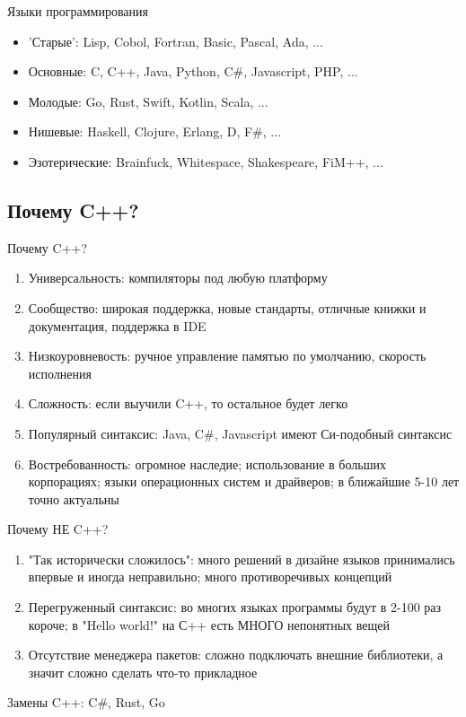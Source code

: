 \documentclass[10pt]{beamer}
\begin{document}
\begin{frame}{Языки программирования}
\begin{itemize}
    \item 'Старые': Lisp, Cobol, Fortran, Basic, Pascal, Ada, ...
    \item Основные: C, C++, Java, Python, C\#, Javascript, PHP, ...
    \item Молодые: Go, Rust, Swift, Kotlin, Scala, ...
    \item Нишевые: Haskell, Clojure, Erlang, D, F\#, ...
    \item Эзотерические: Brainfuck, Whitespace, Shakespeare, FiM++, ...
\end{itemize}
\end{frame}

\subsection{Почему C++?}
\begin{frame}{Почему C++?}
\begin{enumerate}
    \item Универсальность: компиляторы под любую платформу
    \item Сообщество: широкая поддержка, новые стандарты, отличные книжки и документация, поддержка в IDE
    \item Низкоуровневость: ручное управление памятью по умолчанию, скорость исполнения
    \item Сложность: если выучили C++, то остальное будет легко
    \item Популярный синтаксис: Java, C#, Javascript имеют Си-подобный синтаксис
    \item Востребованность: огромное наследие; использование в больших корпорациях; языки операционных систем и драйверов; в ближайшие 5-10 лет точно актуальны
\end{enumerate}
\end{frame}

\begin{frame}{Почему НЕ C++?}
\begin{enumerate}
    \item "Так исторически сложилось": много решений в дизайне языков принимались впервые и иногда неправильно; много противоречивых концепций 
    \item Перегруженный синтаксис: во многих языках программы будут в 2-100 раз короче; в "Hello world!" на С++ есть МНОГО непонятных вещей
    \item Отсутствие менеджера пакетов: сложно подключать внешние библиотеки, а значит сложно сделать что-то прикладное
\end{enumerate}

Замены C++: C\#, Rust, Go
\end{frame}
\end{document}
